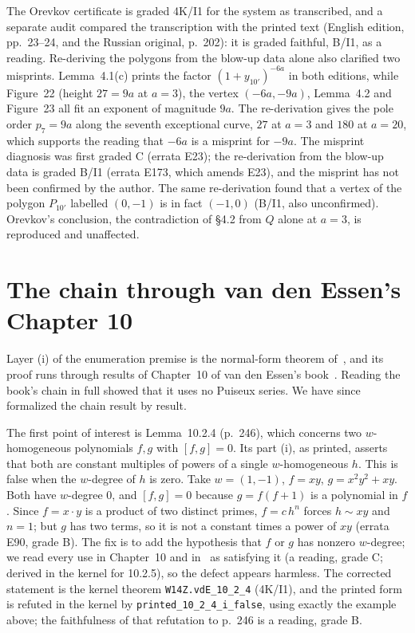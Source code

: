 \documentclass[a4paper,11pt]{article}
\theoremstyle{jsplain}
\theoremstyle{jsdef}
\theoremstyle{jsrem}
\begin{document}
The Orevkov certificate is graded 4K/I1 for the system as transcribed, and a separate audit compared the transcription with the printed text (English edition, pp.~23--24, and the Russian original, p.~202): it is graded faithful, B/I1, as a reading. Re-deriving the polygons from the blow-up data alone also clarified two misprints. Lemma~4.1(c) prints the factor $(1+y_{10'})^{-6a}$ in both editions, while Figure~22 (height $27=9a$ at $a=3$), the vertex $(-6a,-9a)$, Lemma~4.2 and Figure~23 all fit an exponent of magnitude $9a$. The re-derivation gives the pole order $p_7=9a$ along the seventh exceptional curve, $27$ at $a=3$ and $180$ at $a=20$, which supports the reading that $-6a$ is a misprint for $-9a$. The misprint diagnosis was first graded C (errata E23); the re-derivation from the blow-up data is graded B/I1 (errata E173, which amends E23), and the misprint has not been confirmed by the author. The same re-derivation found that a vertex of the polygon $P_{10'}$ labelled $(0,-1)$ is in fact $(-1,0)$ (B/I1, also unconfirmed). Orevkov's conclusion, the contradiction of \S4.2 from $Q$ alone at $a=3$, is reproduced and unaffected.

\section{The chain through van den Essen's Chapter 10}\label{rp:sec:vde}

Layer (i) of the enumeration premise is the normal-form theorem of~\cite{GGV1}, and its proof runs through results of Chapter~10 of van den Essen's book~\cite{vdE2000}. Reading the book's chain in full showed that it uses no Puiseux series. We have since formalized the chain result by result.

The first point of interest is Lemma~10.2.4 (p.~246), which concerns two $w$-homogeneous polynomials $f,g$ with $[f,g]=0$. Its part (i), as printed, asserts that both are constant multiples of powers of a single $w$-homogeneous $h$. This is false when the $w$-degree of $h$ is zero. Take $w=(1,-1)$, $f=xy$, $g=x^2y^2+xy$. Both have $w$-degree $0$, and $[f,g]=0$ because $g=f(f+1)$ is a polynomial in $f$. Since $f=x\cdot y$ is a product of two distinct primes, $f=c\,h^n$ forces $h\sim xy$ and $n=1$; but $g$ has two terms, so it is not a constant times a power of $xy$ (errata E90, grade B). The fix is to add the hypothesis that $f$ or $g$ has nonzero $w$-degree; we read every use in Chapter~10 and in~\cite{GGV1} as satisfying it (a reading, grade C; derived in the kernel for 10.2.5), so the defect appears harmless. The corrected statement is the kernel theorem \texttt{W14Z.\allowbreak{}vdE\_\allowbreak{}10\_\allowbreak{}2\_\allowbreak{}4} (4K/I1), and the printed form is refuted in the kernel by \texttt{printed\_\allowbreak{}10\_\allowbreak{}2\_\allowbreak{}4\_\allowbreak{}i\_\allowbreak{}false}, using exactly the example above; the faithfulness of that refutation to p.~246 is a reading, grade B.
\end{document}

